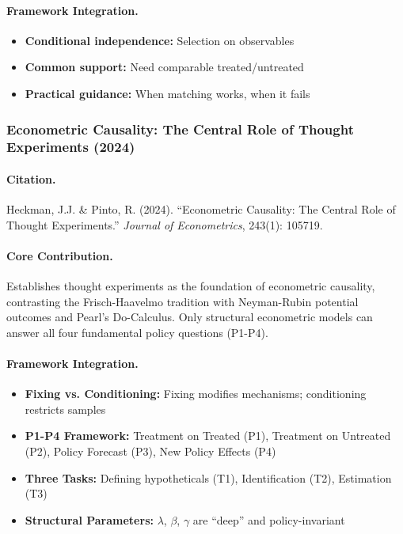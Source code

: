\paragraph{Framework Integration.}
\begin{itemize}
  \item \textbf{Conditional independence:} Selection on observables
  \item \textbf{Common support:} Need comparable treated/untreated
  \item \textbf{Practical guidance:} When matching works, when it fails
\end{itemize}

\subsubsection{Econometric Causality: The Central Role of Thought Experiments (2024)}

\paragraph{Citation.}
Heckman, J.J. \& Pinto, R. (2024). ``Econometric Causality: The Central Role of
Thought Experiments.'' \emph{Journal of Econometrics}, 243(1): 105719.
\citep{PAP-heckman2024causality}

\paragraph{Core Contribution.}
Establishes thought experiments as the foundation of econometric causality,
contrasting the Frisch-Haavelmo tradition with Neyman-Rubin potential outcomes
and Pearl's Do-Calculus. Only structural econometric models can answer all
four fundamental policy questions (P1-P4).

\paragraph{Framework Integration.}
\begin{itemize}
  \item \textbf{Fixing vs. Conditioning:} Fixing modifies mechanisms; conditioning restricts samples
  \item \textbf{P1-P4 Framework:} Treatment on Treated (P1), Treatment on Untreated (P2),
        Policy Forecast (P3), New Policy Effects (P4)
  \item \textbf{Three Tasks:} Defining hypotheticals (T1), Identification (T2), Estimation (T3)
  \item \textbf{Structural Parameters:} $\lambda$, $\beta$, $\gamma$ are ``deep'' and policy-invariant
\end{itemize}


